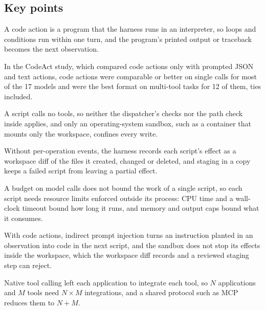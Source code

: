 \subsection*{Key points}
\bi
\item A code action is a program that the harness runs in an interpreter, so loops and conditions
run within one turn, and the program's printed output or traceback becomes the next observation.
\item In the CodeAct study, which compared code actions only with prompted JSON and text actions,
code actions were comparable or better on single calls for most of the 17 models and were the best
format on multi-tool tasks for 12 of them, ties included.
\item A script calls no tools, so neither the dispatcher's checks nor the path check inside
 applies, and only an operating-system sandbox, such as a container that mounts only
the workspace, confines every write.
\item Without per-operation events, the harness records each script's effect as a workspace diff
of the files it created, changed or deleted, and staging in a copy keeps a failed script from
leaving a partial effect.
\item A budget on model calls does not bound the work of a single script, so each script needs
resource limits enforced outside its process: CPU time and a wall-clock timeout bound how long it
runs, and memory and output caps bound what it consumes.
\item With code actions, indirect prompt injection turns an instruction planted in an observation
into code in the next script, and the sandbox does not stop its effects inside the workspace, which
the workspace diff records and a reviewed staging step can reject.
\item Native tool calling left each application to integrate each tool, so $N$ applications and $M$
tools need $N \times M$ integrations, and a shared protocol such as MCP reduces them to $N + M$.
\ei
